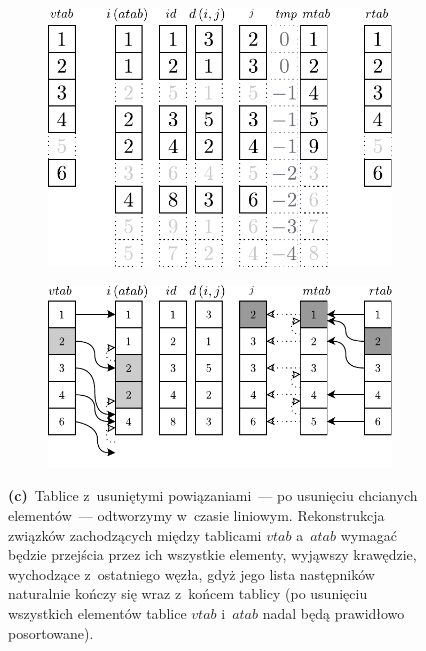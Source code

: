\begin{figure}[!htbp]
	\ContinuedFloat
	\centering
	\null\hfill
	\begin{subfigure}[b]{0.4\textwidth}
		\includegraphics[width=\textwidth]{Chapter_I/FORWARD-REVERSE-REMOVE-Example/c.pdf}
		\caption{}
		\label{fig:forwardReverseStarRepresentationDeleteNode1:c}
	\end{subfigure}%
	\hfill
	\begin{subfigure}[b]{0.55\textwidth}
		\includegraphics[width=\textwidth]{Chapter_I/FORWARD-REVERSE-REMOVE-Example/d.pdf}
		\caption{}
		\label{fig:forwardReverseStarRepresentationDeleteNode1:d}
	\end{subfigure}
	\hfill\null
	\caption{
		\textbf{(c)}~Tablice z~usuniętymi powiązaniami~--- po usunięciu chcianych elementów~--- odtworzymy w~czasie liniowym.
		Rekonstrukcja związków zachodzących między tablicami $vtab$ a~$atab$ wymagać będzie przejścia przez ich wszystkie elementy, wyjąwszy krawędzie, wychodzące z~ostatniego węzła, gdyż jego lista następników naturalnie kończy się wraz z~końcem tablicy (po usunięciu wszystkich elementów tablice $vtab$ i~$atab$ nadal będą prawidłowo posortowane).
}
\end{figure}
